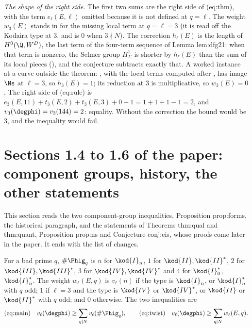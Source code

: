 \begin{sloppypar}
\emph{The shape of the right side.} The first two sums are the right side of (eq:thm), with the term $e_\ell(E,\ell)$ omitted because it is not defined at $q=\ell$. The weight
$w_3(E)$ stands in for the missing local term at $q=\ell=3$ (it is read off the Kodaira type at $3$, and is $0$ when $3\nmid N$). The correction $h_\ell(E)$ is the length of
$H^0(\Q,W^D)$, the last term of the four-term sequence of Lemma lem:dfg21: when that term is nonzero, the Selmer group $H^1_\Sigma$ is shorter by $h_\ell(E)$ than the sum of its
local pieces (), and the conjecture subtracts exactly that. A worked instance at a curve outside the theorem: , with the local
terms computed after , has image $\Ns$ at $\ell=3$, so $h_3(E)=1$; its reduction at $3$ is multiplicative, so $w_3(E)=0$. The right side of (eq:rule) is
$e_3(E,11)+t_3(E,2)+t_3(E,3)+0-1=1+1+1-1=2$, and $v_3(\degphi)=v_3(144)=2$: equality. Without the correction the bound would be $3$, and the inequality would fail.

\section[Paper 1.4 to 1.6: the other statements]{Sections 1.4 to 1.6 of the paper: component groups, history, the other statements}\label{sec:paper:forms-history}

This section reads the two component-group inequalities, Proposition prop:forms, the historical paragraph, and the statements of Theorems thm:qual
and thm:quant, Proposition prop:ns and Conjecture conj:eis, whose proofs come later in the paper. It ends with the list of changes.

\begin{definition}\label{def:paper:weights}
For a bad prime $q$, $\#\Phig_q$ is $n$ for $\kod{I}_n$, $1$ for $\kod{II},\kod{II}^*$, $2$ for $\kod{III},\kod{III}^*$, $3$ for $\kod{IV},\kod{IV}^*$ and $4$ for $\kod{I}_0^*$, $\kod{I}_n^*$. The weight
$w_\ell(E,q)$ is $v_\ell(n)$ if the type is $\kod{I}_n$, or $\kod{I}_n^*$ with $q$ odd; $1$ if $\ell=3$ and the type is $\kod{IV}$ or $\kod{IV}^*$, or $\kod{II}$ or $\kod{II}^*$ with $q$ odd; and $0$
otherwise. The two inequalities are
\[
\text{(eq:main)}\quad v_\ell(\degphi)\ge\sum_{q\mid N}v_\ell(\#\Phig_q),\qquad\text{(eq:twist)}\quad v_\ell(\degphi)\ge\sum_{q\mid N}w_\ell(E,q).
\]
\end{definition}


\end{sloppypar}
